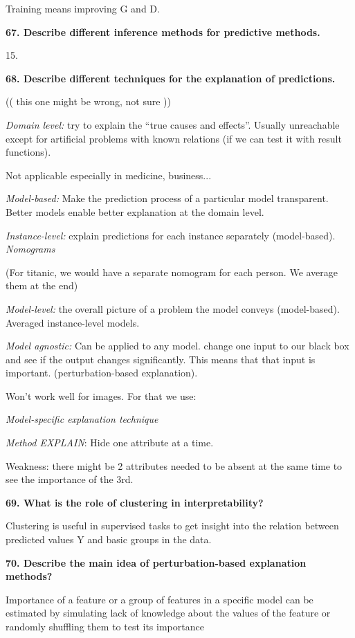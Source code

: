 Training means improving G and D.

\textbf{67. Describe different inference methods for predictive
methods.}

15.

\textbf{68. Describe different techniques for the explanation of
predictions.}

(( this one might be wrong, not sure ))

\textit{Domain level:} try to explain the ``true causes and
effects''. Usually unreachable except for artificial problems with known
relations (if we can test it with result functions).

Not applicable especially in medicine, business...

\textit{Model-based:} Make the prediction process of a particular
model transparent. Better models enable better explanation at the domain
level.

\textit{Instance-level:} explain predictions for each instance
separately (model-based). \textit{Nomograms}

(For titanic, we would have a separate nomogram for each person. We
average them at the end)

\textit{Model-level:} the overall picture of a problem the model
conveys (model-based). Averaged instance-level models.

\textit{Model agnostic:} Can be applied to any model. change one
input to our black box and see if the output changes significantly. This
means that that input is important. (perturbation-based explanation).

Won't work well for images. For that we use:

\textit{Model-specific explanation technique}

\textit{Method EXPLAIN}: Hide one attribute at a time.

Weakness: there might be 2 attributes needed to be absent at the same
time to see the importance of the 3rd.

\textbf{69. What is the role of clustering in interpretability?}

Clustering is useful in supervised tasks to get insight into the
relation between predicted values Y and basic groups in the data.

\textbf{70. Describe the main idea of perturbation-based explanation
methods?}

Importance of a feature or a group of features in a specific model can
be estimated by simulating lack of knowledge about the values of the
feature or randomly shuffling them to test its importance

